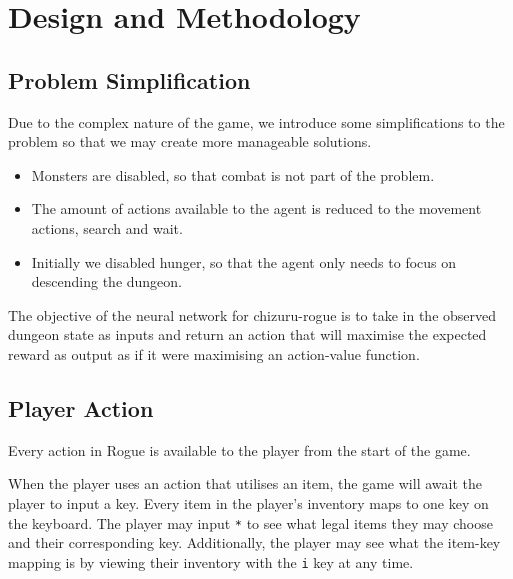 \documentclass[12pt,a4paper]{article}
\begin{document}
    \section{Design and Methodology}\label{sec:design-and-methodology}
    \subsection{Problem Simplification}\label{subsec:problem-simplification}
    Due to the complex nature of the game, we introduce some simplifications to the problem so that
    we may create more manageable solutions.

    \begin{itemize}
        \item Monsters are disabled, so that combat is not part of the problem.
        \item The amount of actions available to the agent is reduced to the movement actions, search and wait.
        \item Initially we disabled hunger, so that the agent only needs to focus on descending the dungeon.
    \end{itemize}

    The objective of the neural network for chizuru-rogue is to take in the observed dungeon state as inputs and return an action that will maximise the expected reward as output as if it were maximising an action-value function.

    \subsection{Player Action}\label{subsec:action}
    Every action in Rogue is available to the player from the start of the game.

    When the player uses an action that utilises an item, the game will await the player to input a key.
    Every item in the player's inventory maps to one key on the keyboard.
    The player may input \texttt{*} to see what legal items they may choose and their corresponding key.
    Additionally, the player may see what the item-key mapping is by viewing their inventory with the \texttt{i} key at any time.
\end{document}
